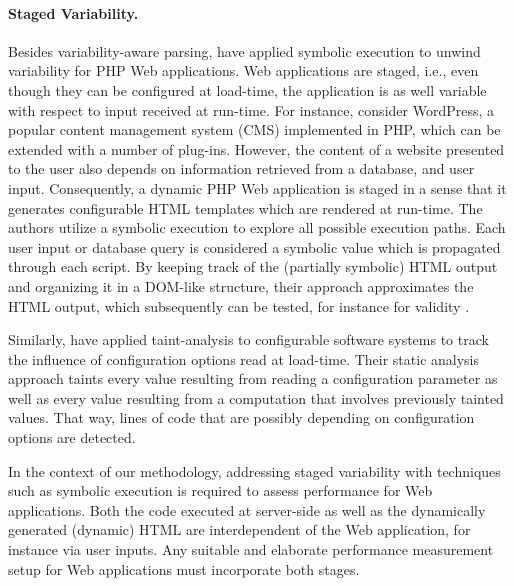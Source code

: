 \paragraph{Staged Variability.} Besides variability-aware parsing,
\cite{nguyen_building_2014} have applied symbolic execution
\citep{king_symbolic_1976,darringer_applications_1978} to unwind variability for
PHP Web applications. Web applications are staged, i.e., even though they can be
configured at load-time, the application is as well variable with respect to
input received at run-time. For instance, consider WordPress, a popular content
management system (CMS) implemented in PHP, which can be extended with a number
of plug-ins. However, the content of a website presented to the user also depends
on information retrieved from a database, and user input. Consequently, a
dynamic PHP Web application is staged in a sense that it generates configurable
HTML templates which are rendered at run-time. The authors utilize a symbolic
execution to explore all possible execution paths. Each user input or database
query is considered a symbolic value which is propagated through each script.
By keeping track of the (partially symbolic) HTML output and organizing it in a
DOM-like structure, their approach approximates the HTML output, which
subsequently can be tested, for instance for validity
\citep{nguyen_auto-locating_2011}.

Similarly, \cite{lillack_tracking_2014} have applied taint-analysis to configurable software
systems to track the influence of configuration options read at load-time.
Their static analysis approach taints every value resulting from reading a
configuration parameter as well as every value resulting from a computation
that involves previously tainted values. That way, lines of code that are
possibly depending on configuration options are detected.

{\color{gray}
In the context of our methodology, addressing staged variability with techniques
such as symbolic execution is required to assess performance for Web
applications. Both the code executed at server-side as well as the dynamically
generated (dynamic) HTML are interdependent of the Web application,  for
instance via user inputs. Any suitable and elaborate performance measurement
setup for Web applications must incorporate both stages. }

